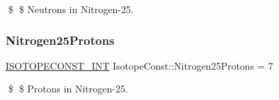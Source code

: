 \$ \$ Neutrons in Nitrogen-\/25. \mbox{\label{group___isotope_const-_nitrogen-_n25_ga70fe31dac4ef006da9ae6030fe2e6169}} 
\subsubsection{\texorpdfstring{Nitrogen25\+Protons}{Nitrogen25Protons}}
{\footnotesize\ttfamily \mbox{\hyperlink{group___isotope_const-_macros_ga5f18360b3e99483a35c32d789e62621c}{I\+S\+O\+T\+O\+P\+E\+C\+O\+N\+S\+T\+\_\+\+I\+NT}} Isotope\+Const\+::\+Nitrogen25\+Protons = 7}

\$ \$ Protons in Nitrogen-\/25. 